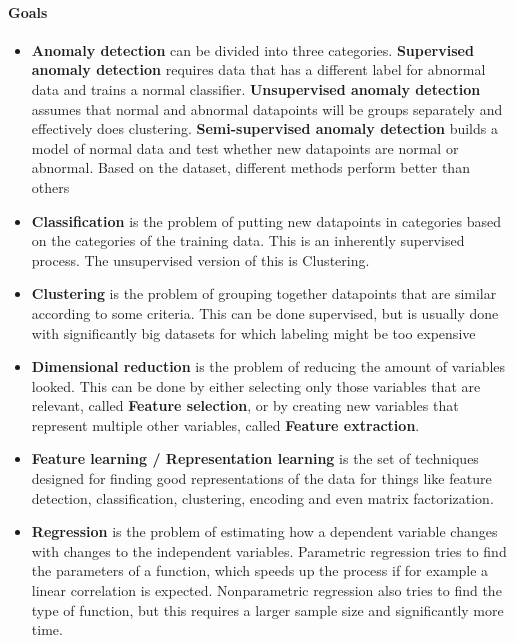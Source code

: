 \paragraph{Goals}
\begin{itemize}
	\item \textbf{Anomaly detection}
		can be divided into three categories. \textbf{Supervised anomaly detection} requires data that has a different label for abnormal data and trains a normal classifier. \textbf{Unsupervised anomaly detection} assumes that normal and abnormal datapoints will be groups separately and effectively does clustering. \textbf{Semi-supervised anomaly detection} builds a model of normal data and test whether new datapoints are normal or abnormal. Based on the dataset, different methods perform better than others
	\item \textbf{Classification}
		is the problem of putting new datapoints in categories based on the categories of the training data. This is an inherently supervised process. The unsupervised version of this is Clustering.
	\item \textbf{Clustering}
		is the problem of grouping together datapoints that are similar according to some criteria. This can be done supervised, but is usually done with significantly big datasets for which labeling might be too expensive
	\item \textbf{Dimensional reduction}
		is the problem of reducing the amount of variables looked. This can be done by either selecting only those variables that are relevant, called \textbf{Feature selection}, or by creating new variables that represent multiple other variables, called \textbf{Feature extraction}.
	\item \textbf{Feature learning / Representation learning}
		is the set of techniques designed for finding good representations of the data for things like feature detection, classification, clustering, encoding and even matrix factorization.
	\item \textbf{Regression}
		is the problem of estimating how a dependent variable changes with changes to the independent variables. Parametric regression tries to find the parameters of a function, which speeds up the process if for example a linear correlation is expected. Nonparametric regression also tries to find the type of function, but this requires a larger sample size and significantly more time.
\end{itemize}

